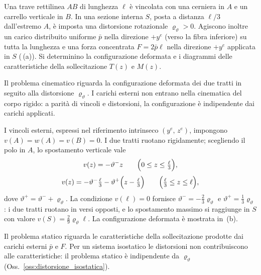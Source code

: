 \begin{esempio} \label{sec:esempio_completo}
	Una trave rettilinea $AB$ di lunghezza $\ell$ è vincolata
	con una cerniera in $A$ e un carrello verticale in $B$.
	In una sezione interna $S$, posta a distanza $\ell/3$
	dall'estremo $A$, è imposta una distorsione rotazionale
	$\varrho_\vartheta > 0$. Agiscono inoltre un carico
	distribuito uniforme $\bar p$ nella direzione $+y^e$
	(verso la fibra inferiore) su tutta la lunghezza e una
	forza concentrata $F = 2\bar p\ell$ nella direzione
	$+y^e$ applicata in $S$
	(\,(a)).
	Si determinino la configurazione deformata e i diagrammi
	delle caratteristiche della sollecitazione $T(z)$ e $M(z)$.
	
	\begin{svolgimento}
		
		Il problema cinematico riguarda la configurazione deformata
		dei due tratti in seguito alla distorsione $\varrho_\vartheta$.
		I carichi esterni non entrano nella cinematica del corpo rigido:
		a parità di vincoli e distorsioni, la configurazione è
		indipendente dai carichi applicati.
		
		I vincoli esterni, espressi nel riferimento intrinseco
		$(y^e,\, z^e)$, impongono $v(A) = w(A) = v(B) = 0$.
		I due tratti ruotano rigidamente; scegliendo il polo in $A$,
		lo spostamento verticale vale
		\begin{equation*}
			v(z) = -\vartheta^- z
			\qquad \Bigl(0 \le z \le \tfrac{\ell}{3}\Bigr),
		\end{equation*}
		\begin{equation*}
			v(z) = -\vartheta^-\tfrac{\ell}{3}
			- \vartheta^+\Bigl(z - \tfrac{\ell}{3}\Bigr)
			\qquad \Bigl(\tfrac{\ell}{3} \le z \le \ell\Bigr),
		\end{equation*}
		dove $\vartheta^+ = \vartheta^- + \varrho_\vartheta$.
		La condizione $v(\ell) = 0$ fornisce
		$\vartheta^- = -\tfrac{2}{3}\varrho_\vartheta$ e
		$\vartheta^+ = \tfrac{1}{3}\varrho_\vartheta$:
		i due tratti ruotano in versi opposti, e lo spostamento
		massimo si raggiunge in $S$ con valore
		$v(S) = \tfrac{2}{9}\varrho_\vartheta\ell$.
		La configurazione deformata è mostrata in
		\,(b).
		
		Il problema statico riguarda le caratteristiche della
		sollecitazione prodotte dai carichi esterni $\bar p$ e $F$.
		Per un sistema isostatico le distorsioni non contribuiscono
		alle caratteristiche: il problema statico è indipendente
		da $\varrho_\vartheta$
		(Oss.~\ref{oss:distorsione_isostatica}).
		

\end{svolgimento}
\end{esempio}

